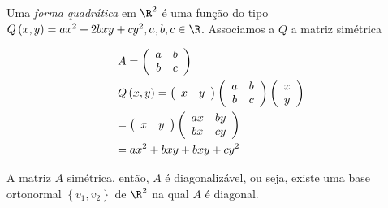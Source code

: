 \documentclass[11pt, oneside, a4paper]{gsm-l}
\begin{document}
\begin{defi}
\begin{sloppypar}
Uma \textit{forma quadrática} em $\R^2$ é uma função do tipo ${Q\left( {x,y} \right) = ax^2  + 2bxy + cy^2 ,a,b,c \in \R}$.
Associamos a $Q$ a matriz simétrica
\end{sloppypar}

\[
\begin{gathered}
A = \left( {\begin{array}{*{20}c}
a & b  \\
b & c  \\

\end{array} } \right) \hfill \\
Q\left( {x,y} \right) = \left( {\begin{array}{*{20}c}
x & y  \\

\end{array} } \right)\left( {\begin{array}{*{20}c}
a & b  \\
b & c  \\

\end{array} } \right)\left( {\begin{array}{*{20}c}
x  \\
y  \\

\end{array} } \right) \hfill \\
= \left( {\begin{array}{*{20}c}
x & y  \\

\end{array} } \right)\left( {\begin{array}{*{20}c}
{ax} & {by}  \\
{bx} & {cy}  \\

\end{array} } \right) \hfill \\
= ax^2  + bxy + bxy + cy^2  \hfill \\
\end{gathered}
\]

\end{defi}

A matriz $A$ simétrica, então, $A$ é diagonalizável, ou seja, existe uma base ortonormal $\left\{ {v_1 ,v_2 } \right\}$ de $\R^2$ na qual $A$ é diagonal.
\end{document}
